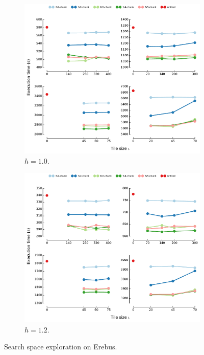 \begin{figure}[htpb]
\begin{subfigure}[]{1\textwidth}
\includegraphics[scale=0.60]{sparsetiling/perf-eval/summary/grid_erebus_plexmesh_h10_mpi.pdf}
\caption{$h = 1.0$.}
\label{fig:st-erebus-expl-h10}
\end{subfigure}%
\par\bigskip
\par\medskip
\begin{subfigure}[]{1\textwidth}
\includegraphics[scale=0.60]{sparsetiling/perf-eval/summary/grid_erebus_plexmesh_h12_mpi.pdf}
\caption{$h = 1.2$.}
\label{fig:st-erebus-expl-h12}
\end{subfigure}%

\caption{Search space exploration on Erebus.}
\label{fig:st-erebus-expl}
\end{figure}


